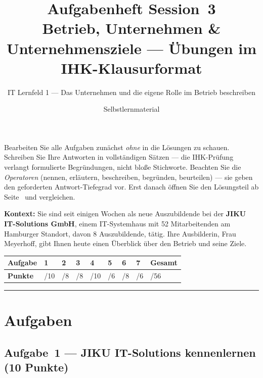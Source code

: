 \documentclass[11pt, a4paper]{article}
\title{\vspace*{-1.5cm}\Huge\bfseries\color{bfwPrimaryDark}Aufgabenheft Session~3\\[0.4em]
  \large\color{bfwInkSoft}\textnormal{Betrieb, Unternehmen \& Unternehmensziele --- Übungen im IHK-Klausurformat}}
\author{\textsf{IT Lernfeld 1 --- Das Unternehmen und die eigene Rolle im Betrieb beschreiben}}
\date{Selbstlernmaterial}
\begin{document}
\maketitle
\thispagestyle{empty}

\begin{merksatz}[title={\bfseries So nutzen Sie dieses Aufgabenheft}]
Bearbeiten Sie alle Aufgaben zunächst \emph{ohne} in die Lösungen zu schauen. Schreiben
Sie Ihre Antworten in vollständigen Sätzen --- die IHK-Prüfung verlangt formulierte
Begründungen, nicht bloße Stichworte. Beachten Sie die \emph{Operatoren} (nennen,
erläutern, beschreiben, begründen, beurteilen) --- sie geben den geforderten
Antwort-Tiefegrad vor. Erst danach öffnen Sie den Lösungsteil ab Seite~\pageref{loesungen}
und vergleichen.
\end{merksatz}

\bigskip

\textbf{Kontext:} Sie sind seit einigen Wochen als neue Auszubildende bei der \textbf{JIKU IT-Solutions GmbH},
einem IT-Systemhaus mit 52 Mitarbeitenden am Hamburger Standort, davon 8 Auszubildende, tätig.
Ihre Ausbilderin, Frau Meyerhoff, gibt Ihnen heute einen Überblick über den Betrieb und seine Ziele.

\bigskip

\noindent
\begin{tabular}{|l|l|l|l|l|l|l|l|l|}
\hline
\textbf{Aufgabe} & 1 & 2 & 3 & 4 & 5 & 6 & 7 & \textbf{Gesamt}\\
\hline
\textbf{Punkte} & /10 & /8 & /8 & /10 & /6 & /8 & /6 & /56\\
\hline
\end{tabular}

\tableofcontents
\vspace{1em}
\hrule

\section{Aufgaben}

\subsection*{Aufgabe~1 --- JIKU IT-Solutions kennenlernen (10 Punkte)}
\end{document}
